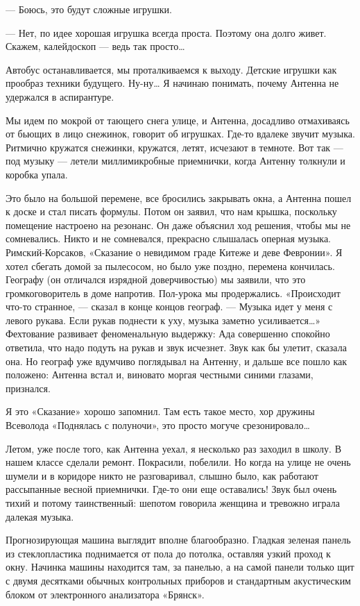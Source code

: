 — Боюсь, это будут сложные игрушки.

— Нет, по  идее хорошая игрушка  всегда проста. Поэтому  она долго  живет.
Скажем, калейдоскоп — ведь так просто…

Автобус останавливается, мы проталкиваемся  к выходу. Детские игрушки  как
прообраз техники будущего.  Ну-ну… Я начинаю  понимать, почему Антенна  не
удержался в аспирантуре.

Мы идем по мокрой от тающего снега улице, и Антенна, досадливо отмахиваясь
от бьющих  в лицо  снежинок, говорит  об игрушках.  Где-то вдалеке  звучит
музыка. Ритмично кружатся снежинки,  кружатся, летят, исчезают в  темноте.
Вот так —  под музыку  — летели миллимикробные  приемнички, когда  Антенну
толкнули и коробка упала.

Это было  на большой  перемене, все  бросились закрывать  окна, а  Антенна
пошел к доске  и стал  писать формулы. Потом  он заявил,  что нам  крышка,
поскольку помещение настроено на резонанс.  Он даже объяснил ход  решения,
чтобы мы  не  сомневались.  Никто и  не  сомневался,  прекрасно  слышалась
оперная музыка.  Римский-Корсаков, «Сказание  о невидимом  граде Китеже  и
деве Февронии». Я хотел  сбегать домой за пылесосом,  но было уже  поздно,
перемена кончилась.  Географу  (он отличался  изрядной  доверчивостью)  мы
заявили,  что  это   громкоговоритель  в  доме   напротив.  Пол-урока   мы
продержались.  «Происходит  что-то  странное,  —  сказал  в  конце  концов
географ. — Музыка идет у меня с левого рукава. Если рукав поднести к  уху,
музыка заметно усиливается…» Фехтование развивает феноменальную  выдержку:
Ада совершенно  спокойно  ответила,  что  надо  подуть  на  рукав  и  звук
исчезнет. Звук  как  бы  улетит,  сказала она.  Но  географ  уже  вдумчиво
поглядывал на Антенну, и дальше все  пошло как положено: Антенна встал  и,
виновато моргая честными синими глазами, признался.

Я это  «Сказание»  хорошо запомнил.  Там  есть такое  место,  хор  дружины
Всеволода «Поднялась с полуночи», это просто могуче срезонировало…

Летом, уже после того, как Антенна уехал, я несколько раз заходил в школу.
В нашем классе сделали ремонт. Покрасили,  побелили. Но когда на улице  не
очень шумели и в коридоре никто не разговаривал, слышно было, как работают
рассыпанные весной приемнички. Где-то они  еще оставались! Звук был  очень
тихий и потому  таинственный: шепотом говорила  женщина и тревожно  играла
далекая музыка.

Прогнозирующая машина выглядит вполне благообразно. Гладкая зеленая панель
из стеклопластика поднимается от пола до потолка, оставляя узкий проход  к
окну. Начинка машины находится там, за  панелью, а на самой панели  только
щит  с  двумя  десятками   обычных  контрольных  приборов  и   стандартным
акустическим блоком от электронного анализатора «Брянск».


